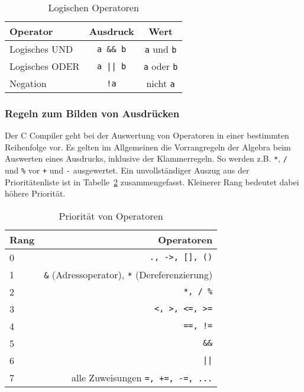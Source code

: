 \begin{table}
  \centering
  \begin{tabular}{l c c}
    \hline
    Operator & Ausdruck & Wert \\
    \hline
    Logisches UND & \verb|a && b|  &   \verb|a| und \verb|b| \\

    Logisches ODER & \verb'a || b'  &   \verb|a| oder \verb|b| \\

    Negation      & \verb|!a|      &   nicht \verb|a| \\
    \hline
  \end{tabular}
  \caption{Logischen Operatoren \label{vergoper2}}
\end{table}

\subsubsection{Regeln zum Bilden von Ausdrücken}

Der C Compiler geht bei der Auswertung von Operatoren in einer bestimmten Reihenfolge vor.
Es gelten im Allgemeinen die Vorrangregeln der Algebra beim Auswerten eines Ausdrucks, inklusive der Klammerregeln.
So werden z.B. \verb|*|, \verb|/| und \verb|%| vor \verb|+| und \verb|-| ausgewertet.
Ein unvollständiger Auszug aus der Prioritätenliste ist in Tabelle~\ref{tab:prior} zusammengefasst.
Kleinerer Rang bedeutet dabei höhere Priorität.

\begin{table}
  \centering
  \begin{tabular}{l r}
    \hline
    Rang & Operatoren \\
    \hline
    0 & \texttt{., ->, [], ()}\\
    1 & \texttt{\&} (Adressoperator), \texttt{*} (Dereferenzierung)\\
    2 & \texttt{*, / \%}\\
    3 & \texttt{<, >, <=, >=}\\
    4 & \texttt{==, !=}\\
    5 & \texttt{\&\&}\\
    6 & \texttt{||}\\
    7 & alle Zuweisungen \texttt{=, +=, -=, ...}\\
    \hline
  \end{tabular}
  \caption{Priorität von Operatoren}
  \label{tab:prior}
\end{table}

